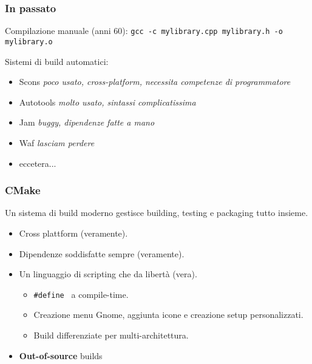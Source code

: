 \documentclass[12pt] {beamer}
\begin{document}
\begin{frame}
\frametitle{In passato}
Compilazione manuale (anni 60):
\texttt{gcc -c mylibrary.cpp mylibrary.h -o mylibrary.o}

Sistemi di build automatici:

\begin{itemize}
\item Scons \textit{poco usato, cross-platform, necessita competenze di programmatore}
\item Autotools \textit{ molto usato, sintassi complicatissima }
\item Jam \textit{ buggy, dipendenze fatte a mano}
\item Waf \textit{lasciam perdere}
\item eccetera...
\end{itemize}
\end{frame}

\begin{frame}
\frametitle{CMake}
Un sistema di build moderno gestisce building, testing e packaging tutto insieme.
\begin{itemize}
		\item Cross plattform (veramente).
		\item Dipendenze soddisfatte sempre (veramente).
		\item Un linguaggio di scripting che da libertà (vera).
		\begin{itemize}
			\item \texttt{\#define } a compile-time.
			\item Creazione menu Gnome, aggiunta icone e creazione setup personalizzati.
			\item Build differenziate per multi-architettura.
		\end{itemize}
		\item \textbf{Out-of-source} builds
\end{itemize}
\end{frame}
\end{document}
